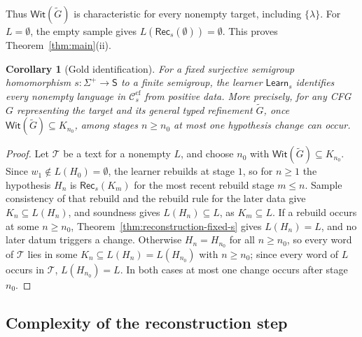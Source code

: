 \documentclass[11pt,a4paper]{article}
\newtheorem{corollary}[theorem]{Corollary}
\theoremstyle{remark}
\theoremstyle{plain}
\newcommand{\WitnessSet}{\mathsf{Wit}}
\newcommand{\cf}{\mathrm{cf}}
\newcommand{\Ccf}[1]{\mathcal C_{#1}^{\cf}}
\begin{document}
Thus $\WitnessSet(\widetilde G)$ is characteristic
for every nonempty target, including $\{\lambda\}$.
For $L=\emptyset$, the empty sample gives
$L(\mathsf{Rec}_s(\emptyset))=\emptyset$.
This proves Theorem~\ref{thm:main}(ii).

\begin{corollary}[Gold identification]\label{cor:ilt}
For a fixed surjective semigroup homomorphism
$s:\Sigma^+\to\mathsf S$ to a finite semigroup,
the learner $\mathsf{Learn}_s$ identifies every
nonempty language in $\Ccf{s}$ from positive data.
More precisely, for any CFG $G$ representing
the target and its general typed refinement
$\widetilde G$, once
$\WitnessSet(\widetilde G)\subseteq K_{n_0}$,
among stages $n\ge n_0$ at most one hypothesis
change can occur.
\end{corollary}

\begin{proof}
Let $\mathcal T$ be a text for a nonempty $L$, and choose $n_0$ with
$\WitnessSet(\widetilde G)\subseteq K_{n_0}$.  Since
$w_1\notin L(H_0)=\emptyset$, the learner rebuilds at stage $1$, so for
$n\ge1$ the hypothesis $H_n$ is $\mathsf{Rec}_s(K_m)$ for the most recent
rebuild stage $m\le n$.  Sample consistency of that rebuild and the rebuild
rule for the later data give $K_n\subseteq L(H_n)$, and soundness gives
$L(H_n)\subseteq L$, as $K_m\subseteq L$.  If a rebuild occurs at some
$n\ge n_0$, Theorem~\ref{thm:reconstruction-fixed-s} gives $L(H_n)=L$, and
no later datum triggers a change.  Otherwise $H_n=H_{n_0}$ for all
$n\ge n_0$, so every word of $\mathcal T$ lies in some
$K_n\subseteq L(H_n)=L(H_{n_0})$ with $n\ge n_0$; since every word of $L$
occurs in $\mathcal T$, $L(H_{n_0})=L$.  In both cases at most one change occurs
after stage $n_0$.
\end{proof}

\subsection{Complexity of the reconstruction step}
\label{sec:complexity}
\end{document}
